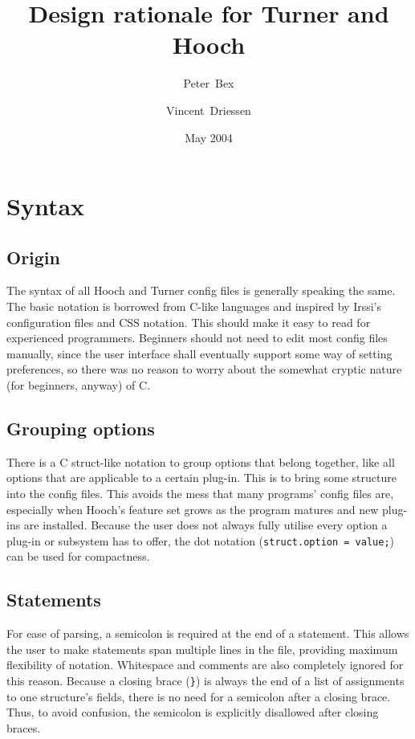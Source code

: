 \documentclass[a4paper]{article}
\title{Design rationale for Turner and Hooch}
\date{May 2004}
\author{Peter~Bex\and{}Vincent~Driessen}
\begin{document}
\maketitle

\section{Syntax}

\subsection{Origin}

The syntax of all Hooch and Turner config files is generally speaking
the same.  The basic notation is borrowed from C-like languages and
inspired by Irssi's configuration files and CSS notation.  This should
make it easy to read for experienced programmers.  Beginners should not
need to edit most config files manually, since the user interface shall
eventually support some way of setting preferences, so there was no
reason to worry about the somewhat cryptic nature (for beginners,
anyway) of C.
 
\subsection{Grouping options}

There is a C struct-like notation to group options that belong together,
like all options that are applicable to a certain plug-in.  This is to
bring some structure into the config files.  This avoids the mess that
many programs' config files are, especially when Hooch's feature set
grows as the program matures and new plug-ins are installed.  Because
the user does not always fully utilise every option a plug-in or
subsystem has to offer, the dot notation (\texttt{struct.option =
value;}) can be used for compactness.

\subsection{Statements}

For ease of parsing, a semicolon is required at the end of a statement.
This allows the user to make statements span multiple lines in the file,
providing maximum flexibility of notation.  Whitespace and comments are
also completely ignored for this reason.  Because a closing brace
(\verb.}.) is always the end of a list of assignments to one structure's
fields, there is no need for a semicolon after a closing brace.  Thus,
to avoid confusion, the semicolon is explicitly disallowed after closing
braces.
\end{document}
